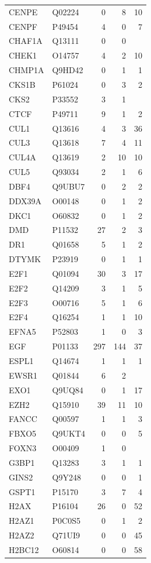 \begin{longtable}{llrrr}
CENPE & Q02224 & 0 & 8 & 10 \\
CENPF & P49454 & 4 & 0 & 7 \\
CHAF1A & Q13111 & 0 & 0 &  \\
CHEK1 & O14757 & 4 & 2 & 10 \\
CHMP1A & Q9HD42 & 0 & 1 & 1 \\
CKS1B & P61024 & 0 & 3 & 2 \\
CKS2 & P33552 & 3 & 1 &  \\
CTCF & P49711 & 9 & 1 & 2 \\
CUL1 & Q13616 & 4 & 3 & 36 \\
CUL3 & Q13618 & 7 & 4 & 11 \\
CUL4A & Q13619 & 2 & 10 & 10 \\
CUL5 & Q93034 & 2 & 1 & 6 \\
DBF4 & Q9UBU7 & 0 & 2 & 2 \\
DDX39A & O00148 & 0 & 1 & 2 \\
DKC1 & O60832 & 0 & 1 & 2 \\
DMD & P11532 & 27 & 2 & 3 \\
DR1 & Q01658 & 5 & 1 & 2 \\
DTYMK & P23919 & 0 & 1 & 1 \\
E2F1 & Q01094 & 30 & 3 & 17 \\
E2F2 & Q14209 & 3 & 1 & 5 \\
E2F3 & O00716 & 5 & 1 & 6 \\
E2F4 & Q16254 & 1 & 1 & 10 \\
EFNA5 & P52803 & 1 & 0 & 3 \\
EGF & P01133 & 297 & 144 & 37 \\
ESPL1 & Q14674 & 1 & 1 & 1 \\
EWSR1 & Q01844 & 6 & 2 &  \\
EXO1 & Q9UQ84 & 0 & 1 & 17 \\
EZH2 & Q15910 & 39 & 11 & 10 \\
FANCC & Q00597 & 1 & 1 & 3 \\
FBXO5 & Q9UKT4 & 0 & 0 & 5 \\
FOXN3 & O00409 & 1 & 0 &  \\
G3BP1 & Q13283 & 3 & 1 & 1 \\
GINS2 & Q9Y248 & 0 & 0 & 1 \\
GSPT1 & P15170 & 3 & 7 & 4 \\
H2AX & P16104 & 26 & 0 & 52 \\
H2AZ1 & P0C0S5 & 0 & 1 & 2 \\
H2AZ2 & Q71UI9 & 0 & 0 & 45 \\
H2BC12 & O60814 & 0 & 0 & 58 \\

\end{longtable}
